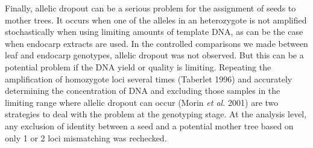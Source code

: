 \documentclass[a4paper,12pt]{article}
\newcommand{\tab}{\hspace{5mm}}
\begin{document}
\tab Finally, allelic dropout can be a serious problem for the assignment of seeds to mother trees. It occurs when one of the alleles in an heterozygote is not amplified stochastically when using limiting amounts of template DNA, as can be the case when endocarp extracts are used. In the controlled comparisons we made between leaf and endocarp genotypes, allelic dropout was not observed. But this can be a potential problem if the DNA yield or quality is limiting. Repeating the amplification of homozygote loci several times (Taberlet 1996) and accurately determining the concentration of DNA and excluding those samples in the limiting range where allelic dropout can occur (Morin \textit{et al. }2001) are two strategies to deal with the problem at the genotyping stage. At the analysis level, any exclusion of identity between a seed and a potential mother tree based on only 1 or 2 loci mismatching was rechecked.
\end{document}
